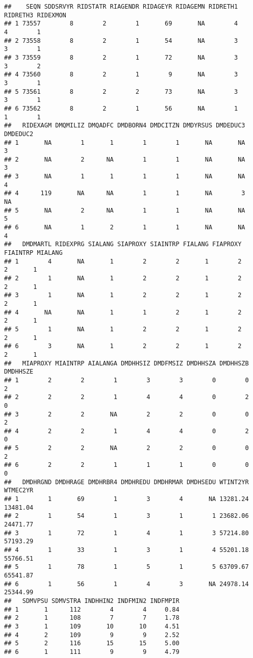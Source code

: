 \documentclass[
]{book}
\begin{document}
\begin{verbatim}
##    SEQN SDDSRVYR RIDSTATR RIAGENDR RIDAGEYR RIDAGEMN RIDRETH1 RIDRETH3 RIDEXMON
## 1 73557        8        2        1       69       NA        4        4        1
## 2 73558        8        2        1       54       NA        3        3        1
## 3 73559        8        2        1       72       NA        3        3        2
## 4 73560        8        2        1        9       NA        3        3        1
## 5 73561        8        2        2       73       NA        3        3        1
## 6 73562        8        2        1       56       NA        1        1        1
##   RIDEXAGM DMQMILIZ DMQADFC DMDBORN4 DMDCITZN DMDYRSUS DMDEDUC3 DMDEDUC2
## 1       NA        1       1        1        1       NA       NA        3
## 2       NA        2      NA        1        1       NA       NA        3
## 3       NA        1       1        1        1       NA       NA        4
## 4      119       NA      NA        1        1       NA        3       NA
## 5       NA        2      NA        1        1       NA       NA        5
## 6       NA        1       2        1        1       NA       NA        4
##   DMDMARTL RIDEXPRG SIALANG SIAPROXY SIAINTRP FIALANG FIAPROXY FIAINTRP MIALANG
## 1        4       NA       1        2        2       1        2        2       1
## 2        1       NA       1        2        2       1        2        2       1
## 3        1       NA       1        2        2       1        2        2       1
## 4       NA       NA       1        1        2       1        2        2       1
## 5        1       NA       1        2        2       1        2        2       1
## 6        3       NA       1        2        2       1        2        2       1
##   MIAPROXY MIAINTRP AIALANGA DMDHHSIZ DMDFMSIZ DMDHHSZA DMDHHSZB DMDHHSZE
## 1        2        2        1        3        3        0        0        2
## 2        2        2        1        4        4        0        2        0
## 3        2        2       NA        2        2        0        0        2
## 4        2        2        1        4        4        0        2        0
## 5        2        2       NA        2        2        0        0        2
## 6        2        2        1        1        1        0        0        0
##   DMDHRGND DMDHRAGE DMDHRBR4 DMDHREDU DMDHRMAR DMDHSEDU WTINT2YR WTMEC2YR
## 1        1       69        1        3        4       NA 13281.24 13481.04
## 2        1       54        1        3        1        1 23682.06 24471.77
## 3        1       72        1        4        1        3 57214.80 57193.29
## 4        1       33        1        3        1        4 55201.18 55766.51
## 5        1       78        1        5        1        5 63709.67 65541.87
## 6        1       56        1        4        3       NA 24978.14 25344.99
##   SDMVPSU SDMVSTRA INDHHIN2 INDFMIN2 INDFMPIR
## 1       1      112        4        4     0.84
## 2       1      108        7        7     1.78
## 3       1      109       10       10     4.51
## 4       2      109        9        9     2.52
## 5       2      116       15       15     5.00
## 6       1      111        9        9     4.79
\end{verbatim}
\end{document}
